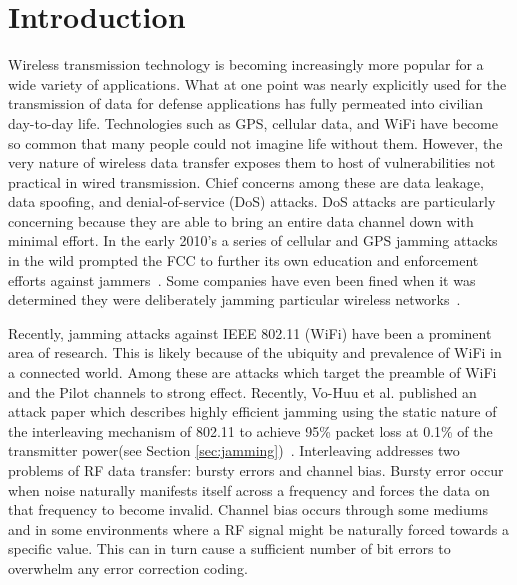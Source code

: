 \documentclass[sigconf, anonymous]{acmart}
\begin{document}


\section{Introduction}

Wireless transmission technology is becoming increasingly more popular for a wide variety of applications. What at one point was nearly explicitly used for the transmission of data for defense applications has fully permeated into civilian day-to-day life. Technologies such as GPS, cellular data, and WiFi have become so common that many people could not imagine life without them. However, the very nature of wireless data transfer exposes them to host of vulnerabilities not practical in wired transmission. Chief concerns among these are data leakage, data spoofing, and denial-of-service (DoS) attacks. DoS attacks are particularly concerning because they are able to bring an entire data channel down with minimal effort. In the early 2010's a series of cellular and GPS jamming attacks in the wild prompted the FCC to further its own education and enforcement efforts against jammers~\cite{FCC2011enforcement}. Some companies have even been fined when it was determined they were deliberately jamming particular wireless networks~\cite{FCC2014marriott}.

Recently, jamming attacks against IEEE 802.11 (WiFi) have been a prominent area of research. This is likely because of the ubiquity and prevalence of WiFi in a connected world. Among these are attacks which target the preamble of WiFi and the Pilot channels to strong effect. Recently, Vo-Huu et al. published an attack paper which describes highly efficient jamming using the static nature of the interleaving mechanism of 802.11 to achieve 95\% packet loss at 0.1\% of the transmitter power(see Section \ref{sec:jamming})~\cite{vo2016interleaving}. Interleaving addresses two problems of RF data transfer: bursty errors and channel bias. Bursty error occur when noise naturally manifests itself across a frequency and forces the data on that frequency to become invalid. Channel bias occurs through some mediums and in some environments where a RF signal might be naturally forced towards a specific value. This can in turn cause a sufficient number of bit errors to overwhelm any error correction coding.
\end{document}
